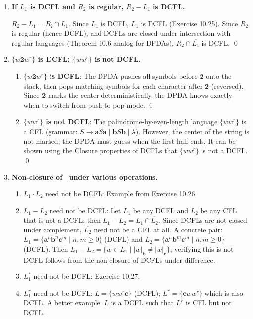\begin{enumerate}[{10.}1. ]
\item \textbf{If $L_1$ is DCFL and $R_2$ is regular, $R_2 - L_1$ is DCFL.}

$R_2 - L_1 = R_2 \cap \overline{L_1}$. Since $L_1$ is DCFL, $\overline{L_1}$ is DCFL (Exercise 10.25). Since $R_2$ is regular (hence DCFL), and DCFLs are closed under intersection with regular languages (Theorem 10.6 analog for DPDAs), $R_2 \cap \overline{L_1}$ is DCFL. \qed

\item \textbf{$\{w\pmb{2}w^r\}$ is DCFL; $\{ww^r\}$ is not DCFL.}

\begin{enumerate}
\item \textbf{$\{w\pmb{2}w^r\}$ is DCFL}: The DPDA pushes all symbols before $\pmb{2}$ onto the stack, then pops matching symbols for each character after $\pmb{2}$ (reversed). Since $\pmb{2}$ marks the center deterministically, the DPDA knows exactly when to switch from push to pop mode. \qed

\item \textbf{$\{ww^r\}$ is not DCFL}: The palindrome-by-even-length language $\{ww^r\}$ is a CFL (grammar: $S\to\pmb{a}S\pmb{a}\mid\pmb{b}S\pmb{b}\mid\lambda$). However, the center of the string is not marked; the DPDA must guess when the first half ends. It can be shown using the Closure properties of DCFLs that $\{ww^r\}$ is not a DCFL. \qed
\end{enumerate}

\item \textbf{Non-closure of \ASIG\ under various operations.}

\begin{enumerate}
\item $L_1\cdot L_2$ need not be DCFL: Example from Exercise 10.26.
\item $L_1 - L_2$ need not be DCFL: Let $L_1$ be any DCFL and $L_2$ be any CFL that is not a DCFL; then $L_1 - L_2 = L_1 \cap \overline{L_2}$. Since DCFLs are not closed under complement, $\overline{L_2}$ need not be a CFL at all. A concrete pair: $L_1 = \{\pmb{a}^n\pmb{b}^n\pmb{c}^m \mid n,m\geq 0\}$ (DCFL) and $L_2 = \{\pmb{a}^n\pmb{b}^m\pmb{c}^m \mid n,m\geq 0\}$ (DCFL). Then $L_1 - L_2 = \{w\in L_1 \mid |w|_{\pmb{b}}\neq|w|_{\pmb{c}}\}$; verifying this is not DCFL follows from the non-closure of DCFLs under difference.
\item $L_1^*$ need not be DCFL: Exercise 10.27.
\item $L_1^r$ need not be DCFL: $L = \{ww^r\pmb{c}\}$ (DCFL); $L^r = \{\pmb{c}ww^r\}$ which is also DCFL. A better example: $L$ is a DCFL such that $L^r$ is CFL but not DCFL.
\end{enumerate}


\end{enumerate}
